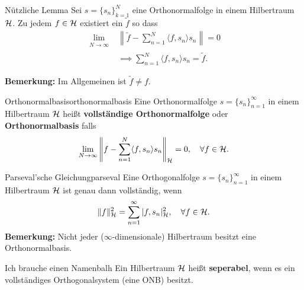 \begin{recipe}{Nützliche Lemma}
Sei $s = \{s_{n}\}_{k=1}^{N}$ eine Orthonormalfolge in einem Hilbertraum $\mathcal{H}$. Zu jedem $f \in \mathcal{H}$ existiert ein $\tilde{f}$ so dass
\begin{align}
  \lim_{\substack{N \to \infty}} &\left\| \tilde{f} - \sum\limits_{n=1}^{N} \langle f, s_{n} \rangle s_{n} \right\| = 0\\
  &\implies \sum\limits_{n=1}^{N} \langle f, s_{n} \rangle s_{n} = \tilde{f}.
\end{align}

\textbf{Bemerkung:} Im Allgemeinen ist $\tilde{f} \neq f$.
\end{recipe}

\begin{boringDef}{Orthonormalbasis}{orthonormalbasis}
  Eine Orthonormalfolge $s = {\{s_{n}\}}_{n=1}^{\infty}$ in einem Hilbertraum $\mathcal{H}$ heißt \textbf{vollständige Orthonormalfolge} oder \textbf{Orthonormalbasis} falls
  \begin{equation}
    \lim_{\substack{N \to \infty}} {\left\| f - \sum\limits_{n=1}^{N} \langle f, s_{n} \rangle s_{n} \right\|}_{\mathcal{H}}= 0, \quad \forall f \in \mathcal{H}.
  \end{equation}
\end{boringDef}


\begin{mytheo}{Parseval'sche Gleichung}{parseval}
  Eine Orthogonalfolge $s = {\{s_{n}\}}_{n=1}^{\infty}$ in einem Hilbertraum $\mathcal{H}$ ist genau dann vollständig, wenn
  \begin{equation}
    \| f \|_{\mathcal{H}}^{2} = \sum\limits_{n=1}^{\infty} | f, s_{n} |_{\mathcal{H}}^{2}, \quad \forall f \in \mathcal{H}.
  \end{equation}
  \textbf{Bemerkung:} Nicht jeder ($\infty$-dimensionale) Hilbertraum besitzt eine Orthonormalbasis.
\end{mytheo}

\begin{boringDef}{Ich brauche einen Namen}{balh}
  Ein Hilbertraum $\mathcal{H}$ heißt \textbf{seperabel}, wenn es ein vollständiges Orthogonalsystem (eine ONB) besitzt.
\end{boringDef}
